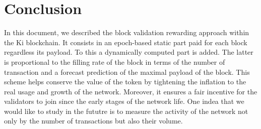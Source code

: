 \documentclass[conference]{IEEEtran}
\begin{document}
\section{Conclusion}
In this document, we described the block validation rewarding approach within the Ki blockchain. It consists in an epoch-based static part paid for each block regardless its payload. To this a dynamically computed part is added. The latter is proportional to the filling rate of the block in terms of the number of transaction and a forecast prediction of the maximal payload of the block. This scheme helps conserve the value of the token by tightening the inflation to the real usage and growth of the network. Moreover, it ensures a fair incentive for the validators to join since the early stages of the network life. One indea that we would like to study in the fututre is to measure the activity of the network not only by the number of transactions but also their volume.
\label{sec:conclusion}
\end{document}
